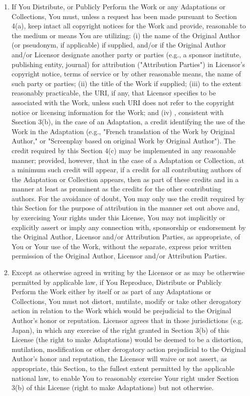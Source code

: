 \begin{enumerate}[noitemsep,label=\alph*.]
      \item If You Distribute, or Publicly Perform the Work or any Adaptations or Collections, You must, unless a request has been made pursuant to Section 4(a), keep intact all copyright notices for the Work and provide, reasonable to the medium or means You are utilizing: (i) the name of the Original Author (or pseudonym, if applicable) if supplied, and/or if the Original Author and/or Licensor designate another party or parties (e.g., a sponsor institute, publishing entity, journal) for attribution ("Attribution Parties") in Licensor's copyright notice, terms of service or by other reasonable means, the name of such party or parties; (ii) the title of the Work if supplied; (iii) to the extent reasonably practicable, the URI, if any, that Licensor specifies to be associated with the Work, unless such URI does not refer to the copyright notice or licensing information for the Work; and (iv) , consistent with Ssection 3(b), in the case of an Adaptation, a credit identifying the use of the Work in the Adaptation (e.g., "French translation of the Work by Original Author," or "Screenplay based on original Work by Original Author"). The credit required by this Section 4(c) may be implemented in any reasonable manner; provided, however, that in the case of a Adaptation or Collection, at a minimum such credit will appear, if a credit for all contributing authors of the Adaptation or Collection appears, then as part of these credits and in a manner at least as prominent as the credits for the other contributing authors. For the avoidance of doubt, You may only use the credit required by this Section for the purpose of attribution in the manner set out above and, by exercising Your rights under this License, You may not implicitly or explicitly assert or imply any connection with, sponsorship or endorsement by the Original Author, Licensor and/or Attribution Parties, as appropriate, of You or Your use of the Work, without the separate, express prior written permission of the Original Author, Licensor and/or Attribution Parties.
      
      \item Except as otherwise agreed in writing by the Licensor or as may be otherwise permitted by applicable law, if You Reproduce, Distribute or Publicly Perform the Work either by itself or as part of any Adaptations or Collections, You must not distort, mutilate, modify or take other derogatory action in relation to the Work which would be prejudicial to the Original Author's honor or reputation. Licensor agrees that in those jurisdictions (e.g. Japan), in which any exercise of the right granted in Section 3(b) of this License (the right to make Adaptations) would be deemed to be a distortion, mutilation, modification or other derogatory action prejudicial to the Original Author's honor and reputation, the Licensor will waive or not assert, as appropriate, this Section, to the fullest extent permitted by the applicable national law, to enable You to reasonably exercise Your right under Section 3(b) of this License (right to make Adaptations) but not otherwise.
    
    \end{enumerate}
    
